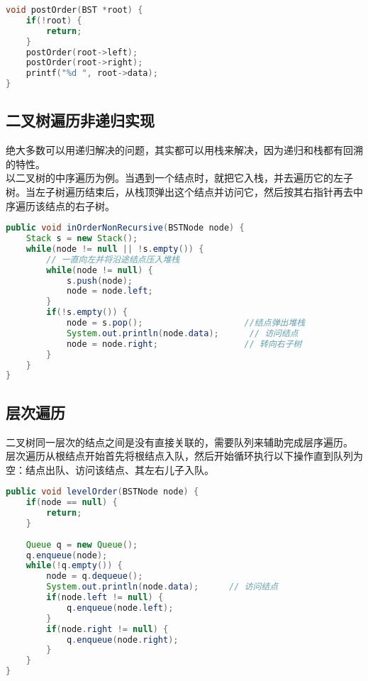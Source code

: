 
\begin{lstlisting}[language=C]
void postOrder(BST *root) {
    if(!root) {
        return;
    }
    postOrder(root->left);
    postOrder(root->right);
    printf("%d ", root->data);
}
\end{lstlisting}

\vspace{0.5cm}

\subsection{二叉树遍历非递归实现}

绝大多数可以用递归解决的问题，其实都可以用栈来解决，因为递归和栈都有回溯的特性。\\

以二叉树的中序遍历为例。当遇到一个结点时，就把它入栈，并去遍历它的左子树。当左子树遍历结束后，从栈顶弹出这个结点并访问它，然后按其右指针再去中序遍历该结点的右子树。\\


\begin{lstlisting}[language=Java]
public void inOrderNonRecursive(BSTNode node) {
    Stack s = new Stack();
    while(node != null || !s.empty()) {
        // 一直向左并将沿途结点压入堆栈
        while(node != null) {
            s.push(node);
            node = node.left;
        }
        if(!s.empty()) {
            node = s.pop();					   //结点弹出堆栈
            System.out.println(node.data);		// 访问结点
            node = node.right;				   // 转向右子树
        }
    }
}
\end{lstlisting}

\vspace{0.5cm}

\subsection{层次遍历}

二叉树同一层次的结点之间是没有直接关联的，需要队列来辅助完成层序遍历。\\

层次遍历从根结点开始首先将根结点入队，然后开始循环执行以下操作直到队列为空：结点出队、访问该结点、其左右儿子入队。\\


\begin{lstlisting}[language=Java]
public void levelOrder(BSTNode node) {
    if(node == null) {
        return;
    }
    
    Queue q = new Queue();
    q.enqueue(node);
    while(!q.empty()) {
        node = q.dequeue();
        System.out.println(node.data);		// 访问结点
        if(node.left != null) {
            q.enqueue(node.left);
        }
        if(node.right != null) {
            q.enqueue(node.right);
        }
    }
}
\end{lstlisting}

